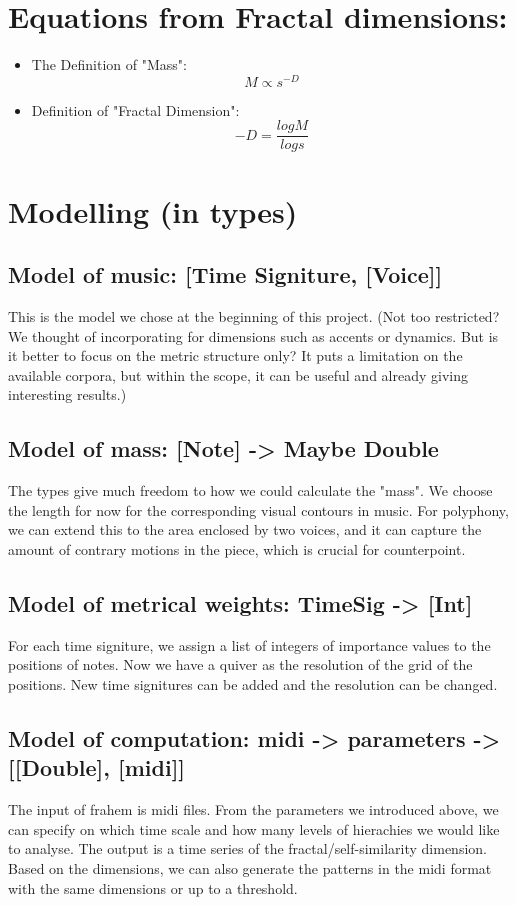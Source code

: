 \documentclass[11pt]{article}
\begin{document}
\section*{Equations from Fractal dimensions:}
\label{sec:orge455160}
\begin{itemize}
\item The Definition of "Mass": $$M\propto{s}^{-D}$$

\item Definition of "Fractal Dimension": $$-D=\frac{logM}{logs}$$
\end{itemize}

\section*{Modelling (in types)}
\label{sec:org564682a}
\subsection*{Model of music: [Time Signiture, [Voice]]}
\label{sec:orgb7b02d6}
This is the model we chose at the beginning of this project. (Not too restricted? We thought of incorporating for dimensions such as accents or dynamics. But is it better to focus on the metric structure only? It puts a limitation on the available corpora, but within the scope, it can be useful and already giving interesting results.)
\subsection*{Model of mass: [Note] -> Maybe Double}
\label{sec:org37199d7}
The types give much freedom to how we could calculate the "mass". We choose the length for now for the corresponding visual contours in music. For polyphony, we can extend this to the area enclosed by two voices, and it can capture the amount of contrary motions in the piece, which is crucial for counterpoint. 
\subsection*{Model of metrical weights: TimeSig -> [Int]}
\label{sec:org6e0d68e}
For each time signiture, we assign a list of integers of importance values to the positions of notes. Now we have a quiver as the resolution of the grid of the positions. New time signitures can be added and the resolution can be changed. 
\subsection*{Model of computation: midi -> parameters -> [[Double], [midi]]}
\label{sec:orgf7a9dae}
The input of frahem is midi files. From the parameters we introduced above, we can specify on which time scale and how many levels of hierachies we would like to analyse. The output is a time series of the fractal/self-similarity dimension. Based on the dimensions, we can also generate the patterns in the midi format with the same dimensions or up to a threshold. 
\end{document}
